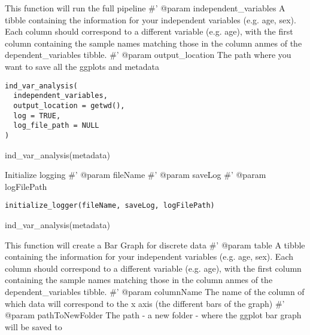 \documentclass[a4paper]{book}
\begin{document}
%
\begin{Description}\relax
This function will run the full pipeline
\#' @param independent\_variables A tibble containing the information for your independent variables (e.g. age, sex). Each column should correspond to a different variable (e.g. age), with the first column containing the sample names matching those in the column anmes of the dependent\_variables tibble.
\#' @param output\_location The path where you want to save all the ggplots and metadata
\end{Description}
%
\begin{Usage}
\begin{verbatim}
ind_var_analysis(
  independent_variables,
  output_location = getwd(),
  log = TRUE,
  log_file_path = NULL
)
\end{verbatim}
\end{Usage}
%
\begin{Examples}
\begin{ExampleCode}
ind_var_analysis(metadata)
\end{ExampleCode}
\end{Examples}
%
\begin{Description}\relax
Initialize logging
\#' @param fileName
\#' @param saveLog 
\#' @param logFilePath
\end{Description}
%
\begin{Usage}
\begin{verbatim}
initialize_logger(fileName, saveLog, logFilePath)
\end{verbatim}
\end{Usage}
%
\begin{Examples}
\begin{ExampleCode}
ind_var_analysis(metadata)
\end{ExampleCode}
\end{Examples}
%
\begin{Description}\relax
This function will create a Bar Graph for discrete data 
\#' @param table A tibble containing the information for your independent variables (e.g. age, sex). Each column should correspond to a different variable (e.g. age), with the first column containing the sample names matching those in the column anmes of the dependent\_variables tibble.
\#' @param columnName The name of the column of which data will correspond to the x axis (the different bars of the graph)
\#' @param pathToNewFolder The path - a new folder - where the ggplot bar graph will be saved to
\end{Description}
\end{document}
